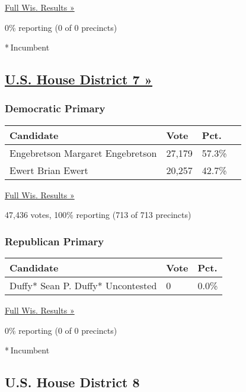 \href{https://www.nytimes3xbfgragh.onion/elections/results/wisconsin}{Full
Wis. Results »}

0\% reporting (0 of 0 precincts)

* Incumbent

\hypertarget{us-house-district-7-}{%
\subsection{\texorpdfstring{\href{https://www.nytimes3xbfgragh.onion/elections/results/wisconsin-house-district-7-primary-election}{U.S.
House District 7
»}}{U.S. House District 7 »}}\label{us-house-district-7-}}

\hypertarget{democratic-primary-8}{%
\subsubsection{Democratic Primary}\label{democratic-primary-8}}

\begin{longtable}[]{@{}llll@{}}
\toprule
Candidate & Vote & Pct. &\tabularnewline
\midrule
\endhead
 Engebretson Margaret Engebretson & 27,179 & 57.3\% &\tabularnewline
 Ewert Brian Ewert & 20,257 & 42.7\% &\tabularnewline
\bottomrule
\end{longtable}

\href{https://www.nytimes3xbfgragh.onion/elections/results/wisconsin}{Full
Wis. Results »}

47,436 votes, 100\% reporting (713 of 713 precincts)

\hypertarget{republican-primary-7}{%
\subsubsection{Republican Primary}\label{republican-primary-7}}

\begin{longtable}[]{@{}lll@{}}
\toprule
Candidate & Vote & Pct.\tabularnewline
\midrule
\endhead
 Duffy* Sean P. Duffy* Uncontested & 0 & 0.0\%\tabularnewline
\bottomrule
\end{longtable}

\href{https://www.nytimes3xbfgragh.onion/elections/results/wisconsin}{Full
Wis. Results »}

0\% reporting (0 of 0 precincts)

* Incumbent

\hypertarget{us-house-district-8}{%
\subsection{U.S. House District 8}\label{us-house-district-8}}

